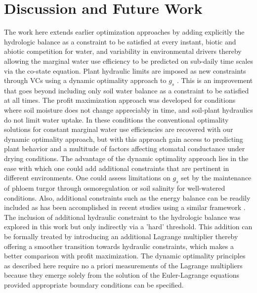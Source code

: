 \documentclass[utf8]{frontiersSCNS} %
\begin{document}
\section{Discussion and Future Work}

The work here extends earlier optimization approaches by adding explicitly the hydrologic balance as a constraint to be satisfied at every instant, biotic and abiotic competition for water, and variability in environmental drivers thereby allowing the marginal water use efficiency to be predicted on sub-daily time scales via the co-state equation.  Plant hydraulic limits are imposed as new constraints through VCs using a dynamic optimality approach to $g_s$ \citep{manzoni_optimization_2013}. This is an improvement that goes beyond including only soil water balance as a constraint to be satisfied at all times.
The profit maximization approach was developed for conditions where soil moisture does not change appreciably in time, and soil-plant hydraulics do not limit water uptake. In these conditions the conventional optimality solutions for constant marginal water use efficiencies  \citep{katul_stomatal_2009} are recovered with our dynamic optimality approach, but with this approach gain access to predicting plant behavior and a multitude of factors affecting stomatal conductance under drying conditions. The advantage of the dynamic optimality approach lies in the ease with which one could add additional constraints that are pertinent in different environments. One could assess limitations on $g_s$ set by the maintenance of phloem turgor through osmoregulation \citep{sevanto_how_2014} or soil salinity for well-watered conditions. Also, additional constraints such as the energy balance can be readily included as has been accomplished in recent studies using a similar framework \citep{roth2018fossil}.  The inclusion of additional hydraulic constraint to the hydrologic balance was explored in this work but only indirectly via a 'hard' threshold. This addition can be formally treated by introducing an additional Lagrange multiplier thereby offering a smoother transition towards hydraulic constraints, which makes a better comparison with profit maximization. The dynamic optimality principles as described here require no a priori measurements of the Lagrange multipliers because they emerge solely from the solution of the Euler-Lagrange equations \citep{witelski_variational_2015} provided appropriate boundary conditions can be specified.
\end{document}

